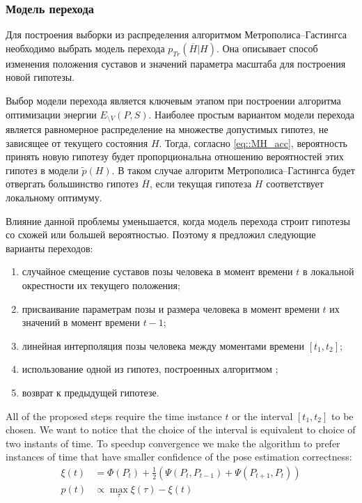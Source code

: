 \subsubsection{Модель перехода}

Для построения выборки из распределения алгоритмом Метрополиса--Гастингса необходимо выбрать модель перехода $p_{Tr}(\overline{H}|H)$. Она описывает способ изменения положения суставов и значений параметра масштаба для построения новой гипотезы.

Выбор модели перехода является ключевым этапом при построении алгоритма оптимизации энергии $E_{\setminus V}(P, S)$. Наиболее простым вариантом модели перехода является равномерное распределение на множестве допустимых гипотез, не зависящее от текущего состояния $H$. Тогда, согласно \eqref{eq::MH_acc}, вероятность принять новую гипотезу будет пропорциональна отношению вероятностей этих гипотез в модели $\tilde{p}(H)$. В таком случае алгоритм Метрополиса--Гастингса будет отвергать большинство гипотез $\overline{H}$, если текущая гипотеза $H$ соответствует локальному оптимуму.

Влияние данной проблемы уменьшается, когда модель перехода строит гипотезы со схожей или большей вероятностью. Поэтому я предложил следующие варианты переходов:
\begin{enumerate}
	\item случайное смещение суставов позы человека в момент времени $t$ в локальной окрестности их текущего положения;
	\item присваивание параметрам позы и размера человека в момент времени $t$ их значений в момент времени $t-1$;
	\item линейная интерполяция позы человека между моментами времени $\left[t_1,t_2\right]$;
	\item использование одной из гипотез, построенных алгоритмом \cite{park2011n};
	\item возврат к предыдущей гипотезе.
\end{enumerate}

All of the proposed steps require the time instance $t$ or the interval $\left[t_1,t_2\right]$ to be chosen. We want to notice that the choice of the interval is equivalent to choice of two instants of time. To speedup convergence we make the algorithm to prefer instances of time that have smaller confidence of the pose estimation correctness:
\begin{equation*}
	\begin{aligned}
		\xi(t) &= \Phi(P_t) + \frac{1}{2} (\Psi(P_t, P_{t-1}) + \Psi(P_{t+1}, P_t)) \\
		p(t) &\propto \underset{\tau}{\max} \xi(\tau) - \xi(t)
	\end{aligned}
\end{equation*}

